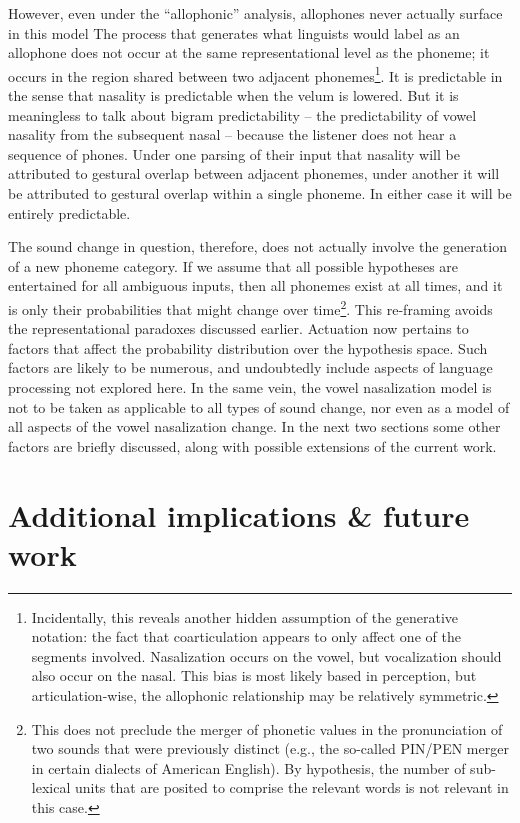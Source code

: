 However, even under the “allophonic” analysis, allophones never
actually surface in this model The process that generates what linguists
would label as an allophone does not occur at the same representational
level as the phoneme; it occurs in the region shared between two adjacent
phonemes\footnote{Incidentally, this reveals another hidden assumption of the generative
notation: the fact that coarticulation appears to only affect one
of the segments involved. Nasalization occurs on the vowel, but vocalization
should also occur on the nasal. This bias is most likely based in
perception, but articulation-wise, the allophonic relationship may
be relatively symmetric.}. It is predictable in the sense that nasality is predictable when
the velum is lowered. But it is meaningless to talk about bigram predictability
– the predictability of vowel nasality from the subsequent nasal –
because the listener does not hear a sequence of phones. Under one
parsing of their input that nasality will be attributed to gestural
overlap between adjacent phonemes, under another it will be attributed
to gestural overlap within a single phoneme. In either case it will
be entirely predictable. 

The sound change in question, therefore, does not actually involve
the generation of a new phoneme category. If we assume that all possible
hypotheses are entertained for all ambiguous inputs, then all phonemes
exist at all times, and it is only their probabilities that might
change over time\footnote{This does not preclude the merger of phonetic values in the pronunciation
of two sounds that were previously distinct (e.g., the so-called PIN/PEN
merger in certain dialects of American English). By hypothesis, the
number of sub-lexical units that are posited to comprise the relevant
words is not relevant in this case.}. This re-framing avoids the representational paradoxes discussed
earlier. Actuation now pertains to factors that affect the probability
distribution over the hypothesis space. Such factors are likely to
be numerous, and undoubtedly include aspects of language processing
not explored here. In the same vein, the vowel nasalization model
is not to be taken as applicable to all types of sound change, nor
even as a model of all aspects of the vowel nasalization change. In
the next two sections some other factors are briefly discussed, along
with possible extensions of the current work.

\section{Additional implications \& future work}

